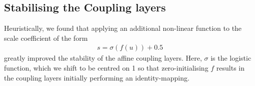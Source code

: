 \subsection{Stabilising the Coupling layers}\label{sec:those-darn-coupling-layers}
%
\noindent Heuristically, we found that  applying an additional non-linear function to the scale
coefficient of the form
%
\begin{align}
  s = \sigma (f(u)) + 0.5
  \label{eq:heuristic-1}
\end{align}
%
greatly improved the stability of the affine coupling layers. 
%
Here, $\sigma$ is the logistic function, which we shift to be centred on 1 so that
zero-initialising $f$ results in the coupling layers initially performing an identity-mapping.

\begin{figure}[tb]
  \centering
\end{figure}
